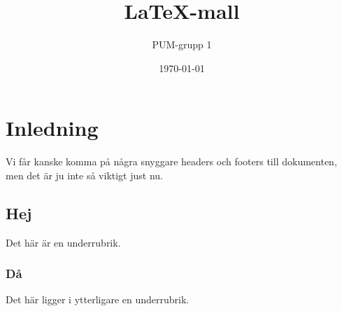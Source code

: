 

\ifpdf
\else
\fi

\title{LaTeX-mall}
\author{PUM-grupp 1}
\date{\today}



\maketitle\thispagestyle{empty}

\newpage

\setcounter{tocdepth}{2}
\tableofcontents
\newpage

\section{Inledning}

Vi får kanske komma på några snyggare headers och footers till dokumenten, men det är ju inte så viktigt just nu.

\subsection{Hej}

Det här är en underrubrik.

\subsubsection{Då}

Det här ligger i ytterligare en underrubrik.


